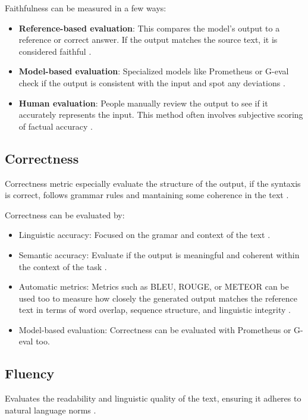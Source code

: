 Faithfulness can be measured in a few ways: 
\begin{itemize}
    \item \textbf{Reference-based evaluation}: This compares the model's output to a reference or correct answer. If the output matches the source text, it is considered faithful \citep{parcalabescu2024measuringfaithfulnessselfconsistencynatural}.  
    \item \textbf{Model-based evaluation}: Specialized models like Prometheus \citep{kim2024prometheus2opensource} or G-eval \cite{liu2023gevalnlgevaluationusing} check if the output is consistent with the input and spot any deviations \citep{gat2023faithfulexplanationsblackboxnlp}.  
    \item \textbf{Human evaluation}: People manually review the output to see if it accurately represents the input. This method often involves subjective scoring of factual accuracy \citep{jacovi-goldberg-2020-towards}.  
\end{itemize}


\subsection{Correctness}
Correctness metric especially evaluate the structure of the output, if the syntaxis is correct, follows grammar rules and mantaining some coherence in the text \citep{varshney-etal-2022-towards}.

Correctness can be evaluated by: 
\begin{itemize} 
    \item Linguistic accuracy: Focused on the gramar and context of the text \citep{varshney-etal-2022-towards}. 
    \item Semantic accuracy: Evaluate if the output is meaningful and coherent within the context of the task \citep{steen2023littlepushnlimodels}. 
    \item Automatic metrics: Metrics such as BLEU, ROUGE, or METEOR can be used too to measure how closely the generated output matches the reference text in terms of word overlap, sequence structure, and linguistic integrity \citep{gat2023faithfulexplanationsblackboxnlp}. 
    \item Model-based evaluation: Correctness can be evaluated with Prometheus or G-eval too\citep{kim2024prometheus2opensource}.\end{itemize}

\subsection{Fluency}
Evaluates the readability and linguistic quality of the text, ensuring it adheres to natural language norms \cite{suadaa-etal-2021-towards, Lee2023ASO}.

